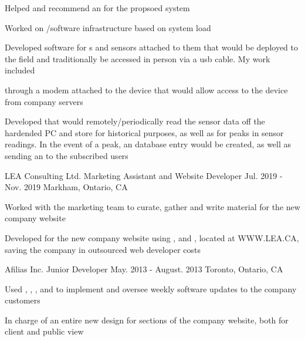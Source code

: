 \begin{cventries}
{\begin{cvitems}
        \begin{cvsubitems}
          \item {Helped  and recommend an  for the propsoed system}
          \item {Worked on /software infrastructure based on system load}
        \end{cvsubitems}
      \item {Developed software for s and sensors attached to them that would be deployed to the field and traditionally be accessed in person via a usb cable. My work included}
        \begin{cvsubitems}
          \item { through a modem attached to the device that would allow  access to the device from company servers}
          \item {Developed  that would remotely/periodically read the sensor data off the hardended PC and store for historical purposes,
           as well as  for peaks in sensor readings. In the event of a peak, an  database entry would be created, as well as sending an  to the subscribed users}
        \end{cvsubitems}
    \end{cvitems}
  }
\cventry
{LEA Consulting Ltd.} %
{Marketing Assistant and Website Developer} %
{Jul. 2019 - Nov. 2019} %
{Markham, Ontario, CA} %
{
  \begin{cvitems} %
    \item {Worked with the marketing team to curate, gather and write material for the new company website}
    \item {Developed  for the new company website using ,  and , located at WWW.LEA.CA, saving the company  in outsourced web developer costs}
  \end{cvitems}
}

\cventry
{Afilias Inc.} %
{Junior Developer} %
{May. 2013 - August. 2013} %
{Toronto, Ontario, CA} %
{
  \begin{cvitems} %
    \item {Used , , ,  and  to implement and oversee weekly software updates to the company customers}
    \item {In charge of an entire new design for sections of the company website, both for client and public view}
  \end{cvitems}
}

\end{cventries}